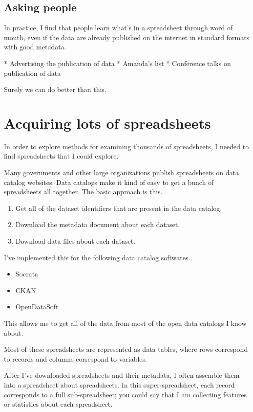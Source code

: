 \documentclass{acm_proc_article-sp}
\begin{document}
\subsection{Asking people}
In practice, I find that people learn what's in a spreadsheet through word
of mouth, even if the data are already published on the internet in standard
formats with good metadata.

* Advertising the publication of data
* Amanda's list
* Conference talks on publication of data

Surely we can do better than this.

\section{Acquiring lots of spreadsheets}
In order to explore methods for examining thousands of spreadsheets,
I needed to find spreadsheets that I could explore.

Many governments and other large organizations publish spreadsheets on
data catalog websites.
Data catalogs make it kind of easy to get a bunch of spreadsheets all together.
The basic approach is this.

\begin{enumerate}
\item Get all of the dataset identifiers that are present in the data catalog.
\item Download the metadata document about each dataset.
\item Download data files about each dataset.
\end{enumerate}

I've implemented this for the following data catalog softwares.

\begin{itemize}
\item Socrata
\item CKAN
\item OpenDataSoft
\end{itemize}

This allows me to get all of the data from most of the open data catalogs I know about.

Most of these spreadsheets are represented as data tables,
where rows correspond to records and columns correspond to variables. \cite{table}

After I've downloaded spreadsheets and their metadata,
I often assemble them into a spreadsheet about spreadsheets. \cite{data-driven}
In this super-spreadsheet, each record corresponds to a full
sub-spreadsheet; you could say that I am collecting features or statistics
about each spreadsheet.
\end{document}

